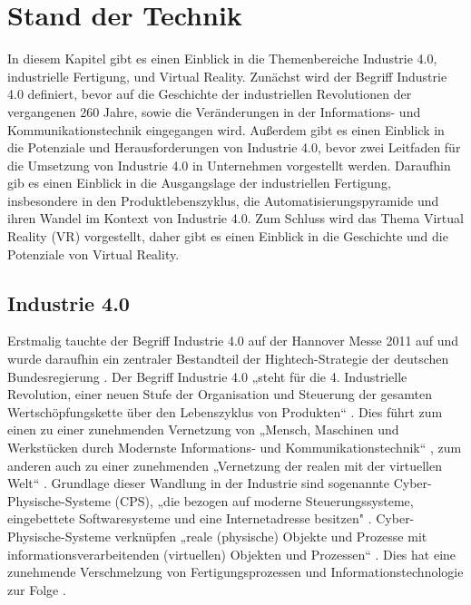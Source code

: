 \chapter{Stand der Technik}\label{cha:StandDerTechnik}

In diesem Kapitel gibt es einen Einblick in die Themenbereiche Industrie 4.0, industrielle Fertigung, und Virtual Reality.
Zunächst wird der Begriff Industrie 4.0 definiert, bevor auf die Geschichte der industriellen Revolutionen der vergangenen 260 Jahre, sowie die Veränderungen in der Informations- und Kommunikationstechnik eingegangen wird. Außerdem gibt es einen Einblick in die Potenziale und Herausforderungen von Industrie 4.0, bevor zwei Leitfaden für die Umsetzung von Industrie 4.0 in Unternehmen vorgestellt werden.
Daraufhin gib es einen Einblick in die Ausgangslage der industriellen Fertigung, insbesondere in den Produktlebenszyklus, die Automatisierungspyramide und ihren Wandel im Kontext von Industrie 4.0.
Zum Schluss wird das Thema Virtual Reality (VR) vorgestellt, daher gibt es einen Einblick in die Geschichte und die Potenziale von Virtual Reality.

\section{Industrie 4.0}\label{sec:Industrie4.0}
Erstmalig tauchte der Begriff Industrie 4.0 auf der Hannover Messe 2011 auf und wurde daraufhin ein zentraler Bestandteil der Hightech-Strategie der deutschen Bundesregierung \cite{8}.
Der Begriff Industrie 4.0 „steht für die 4. Industrielle Revolution, einer neuen Stufe der Organisation und Steuerung der gesamten Wertschöpfungskette über den Lebenszyklus von Produkten“ \cite{1}. Dies führt zum einen zu einer zunehmenden Vernetzung von „Mensch, Maschinen und Werkstücken durch Modernste Informations- und Kommunikationstechnik“ \cite{6}, zum anderen auch zu einer zunehmenden „Vernetzung der realen mit der virtuellen Welt“ \cite{7}.
\newline
Grundlage dieser Wandlung in der Industrie sind sogenannte Cyber-Physische-Systeme (CPS), „die bezogen auf moderne Steuerungssysteme, eingebettete Softwaresysteme und eine Internetadresse besitzen" \cite{1}. Cyber-Physische-Systeme verknüpfen „reale (physische) Objekte und Prozesse mit informationsverarbeitenden (virtuellen) Objekten und Prozessen“ \cite{11}. Dies hat eine zunehmende Verschmelzung von Fertigungsprozessen und Informationstechnologie zur Folge \cite{7}.

